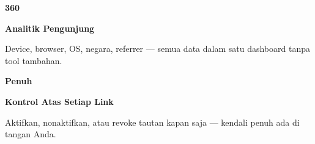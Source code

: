 \documentclass[a4paper]{article}
\begin{document}
\begin{minipage}[t]{0.485\textwidth}
    \noindent\colorbox{BlueBg}{%
        \begin{minipage}[t][2.7cm][c]{\dimexpr\linewidth-2\fboxsep\relax}
            \centering
            {\fontsize{20}{24}\selectfont\bfseries\color{CyanPrimary} 360\textdegree}\par\vspace{2pt}
            {\fontsize{9.5}{12}\selectfont\bfseries\color{BlueDark} Analitik Pengunjung}\par\vspace{2pt}
            {\fontsize{8.5}{11}\selectfont\color{TextDark}Device, browser, OS, negara, referrer --- semua data dalam satu dashboard tanpa tool tambahan.}
        \end{minipage}}\par
    \vspace{6pt}
    \noindent\colorbox{BlueBg}{%
        \begin{minipage}[t][2.7cm][c]{\dimexpr\linewidth-2\fboxsep\relax}
            \centering
            {\fontsize{20}{24}\selectfont\bfseries\color{CyanPrimary} Penuh}\par\vspace{2pt}
            {\fontsize{9.5}{12}\selectfont\bfseries\color{BlueDark} Kontrol Atas Setiap Link}\par\vspace{2pt}
            {\fontsize{8.5}{11}\selectfont\color{TextDark}Aktifkan, nonaktifkan, atau revoke tautan kapan saja --- kendali penuh ada di tangan Anda.}
        \end{minipage}}%
\end{minipage}

\vspace{8pt}
\end{document}
